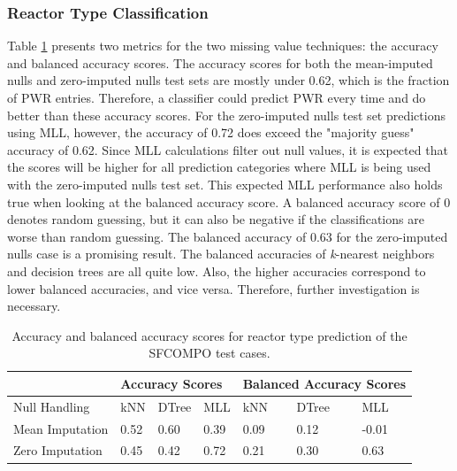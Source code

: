 \subsubsection{Reactor Type Classification}

Table \ref{tbl:sfcorxtr} presents two metrics for the two missing value
techniques: the accuracy and balanced accuracy scores. The accuracy scores for
both the mean-imputed nulls and zero-imputed nulls test sets are mostly under
0.62, which is the fraction of \gls{PWR} entries.  Therefore, a classifier
could predict \gls{PWR} every time and do better than these accuracy scores.
For the zero-imputed nulls test set predictions using \gls{MLL}, however, the
accuracy of 0.72 does exceed the "majority guess" accuracy of 0.62.  Since
\gls{MLL} calculations filter out null values, it is expected that the scores
will be higher for all prediction categories where \gls{MLL} is being used with
the zero-imputed nulls test set. This expected \gls{MLL} performance also holds
true when looking at the balanced accuracy score.  A balanced accuracy score of
0 denotes random guessing, but it can also be negative if the classifications
are worse than random guessing. The balanced accuracy of 0.63 for the
zero-imputed nulls case is a promising result. The balanced accuracies of
\textit{k}-nearest neighbors and decision trees are all quite low. Also, the
higher accuracies correspond to lower balanced accuracies, and vice versa.
Therefore, further investigation is necessary.

\begin{table}[!htb]
  \centering
  \begin{tabular}{@{}m{1.5in}llllll@{}}
    \toprule
    & \multicolumn{3}{m{2in}}{Accuracy Scores} 
    & \multicolumn{3}{l}{Balanced Accuracy Scores} \\ 
    \toprule
    Null Handling    & kNN   & DTree  & MLL   & kNN   & DTree  & MLL    \\ \midrule
    Mean Imputation  & 0.52  & 0.60   & 0.39  & 0.09  & 0.12   & -0.01  \\
    Zero Imputation  & 0.45  & 0.42   & 0.72  & 0.21  & 0.30   & 0.63   \\ \bottomrule
    \end{tabular}
  \caption[Performance of reactor type classification of \acrshort{SFCOMPO} 
           entries]
          {Accuracy and balanced accuracy scores for reactor type prediction 
           of the \acrshort{SFCOMPO} test cases.}
  \label{tbl:sfcorxtr}
\end{table}

